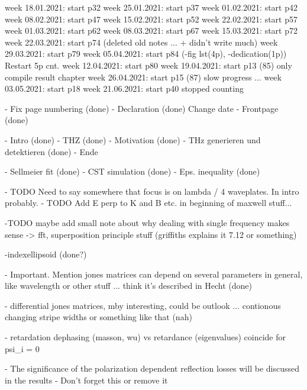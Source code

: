 week 18.01.2021: start p32
week 25.01.2021: start p37
week 01.02.2021: start p42
week 08.02.2021: start p47
week 15.02.2021: start p52
week 22.02.2021: start p57
week 01.03.2021: start p62
week 08.03.2021: start p67
week 15.03.2021: start p72
week 22.03.2021: start p74 (deleted old notes ... + didn't write much)
week 29.03.2021: start p79
week 05.04.2021: start p84 (-fig lst(4p), -dedication(1p)) Restart 5p cnt. 
week 12.04.2021: start p80
week 19.04.2021: start p13 (85) only compile result chapter
week 26.04.2021: start p15 (87) slow progress ...
week 03.05.2021: start p18
week 21.06.2021: start p40
stopped counting

- Fix page numbering (done)
- Declaration (done) Change date
- Frontpage (done)

- Intro (done)
    - THZ (done)
    - Motivation (done)
- THz generieren und detektieren (done)
- Ende 

- Sellmeier fit (done)
- CST simulation (done)
- Eps. inequality (done)

- TODO Need to say somewhere that focus is on lambda / 4 waveplates. In intro probably.
- TODO Add E perp to K and B etc. in beginning of maxwell stuff...

-TODO maybe add small note about why dealing with single frequency makes sense -> fft, superposition principle stuff (griffiths explains it 7.12 or something)

-indexellipsoid (done?)

- Important. Mention jones matrices can depend on several parameters in general, like wavelength or other stuff ... think it's described in Hecht (done)

- differential jones matrices, mby interesting, could be outlook ... contionous changing stripe widths or something like that (nah)

- retardation dephasing (masson, wu) vs retardance (eigenvalues) coincide for psi_i = 0

- The significance of the polarization dependent reflection losses will be discussed in the results
    - Don't forget this or remove it
    



